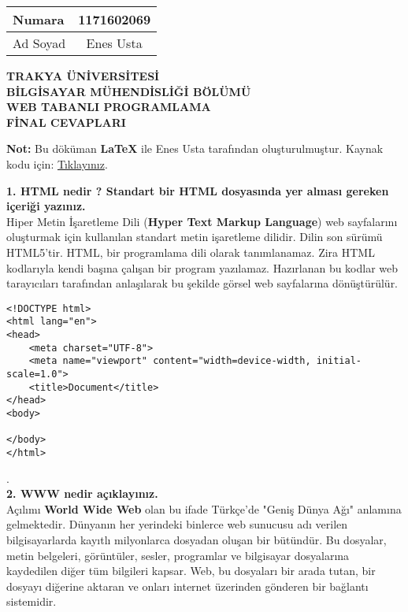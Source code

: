 \documentclass[a4paper,10pt]{article}
\begin{document}
  \begin{tabular}{ | l c | }
    \hline
    Numara & 1171602069 \\ \hline
    Ad Soyad & Enes Usta \\
    \hline
  \end{tabular}

\begin{center}
\textbf{TRAKYA ÜNİVERSİTESİ} \\
\textbf{BİLGİSAYAR MÜHENDİSLİĞİ BÖLÜMÜ} \\
\textbf{WEB TABANLI PROGRAMLAMA} \\
\textbf{FİNAL CEVAPLARI}
\end{center}

\begin{center}
\textbf{Not:} Bu döküman \textbf{LaTeX} ile Enes Usta tarafından oluşturulmuştur.
Kaynak kodu için: \href{https://raw.githubusercontent.com/enesusta/md/master/odevler/web/web.tex?token=AHZZJRTR27UBJX4HSI2OST27AH3RM}{Tıklayınız}.
\end{center}

\vspace{0.5cm}

\textbf{1. HTML nedir ? Standart bir HTML dosyasında yer alması gereken içeriği yazınız.}\\

Hiper Metin İşaretleme Dili (\textbf{Hyper Text Markup Language}) web sayfalarını oluşturmak için kullanılan standart metin işaretleme dilidir. Dilin son sürümü HTML5'tir. HTML, bir programlama dili olarak tanımlanamaz. Zira HTML kodlarıyla kendi başına çalışan bir program yazılamaz.
Hazırlanan bu kodlar web tarayıcıları tarafından anlaşılarak bu şekilde görsel web sayfalarına dönüştürülür.\\
    \begin{lstlisting}
<!DOCTYPE html>
<html lang="en">
<head>
    <meta charset="UTF-8">
    <meta name="viewport" content="width=device-width, initial-scale=1.0">
    <title>Document</title>
</head>
<body>
    
</body>
</html>
    \end{lstlisting}.\\


\textbf{2. WWW nedir açıklayınız.}\\
    
Açılımı \textbf{World Wide Web} olan bu ifade Türkçe’de "Geniş Dünya Ağı" anlamına gelmektedir. Dünyanın her yerindeki binlerce web sunucusu adı verilen bilgisayarlarda kayıtlı milyonlarca dosyadan oluşan bir bütündür. Bu dosyalar, metin belgeleri, görüntüler, sesler, programlar ve bilgisayar dosyalarına kaydedilen diğer tüm bilgileri kapsar. Web, bu dosyaları bir arada tutan, bir dosyayı diğerine aktaran ve onları internet üzerinden gönderen bir bağlantı sistemidir.\\
\end{document}
